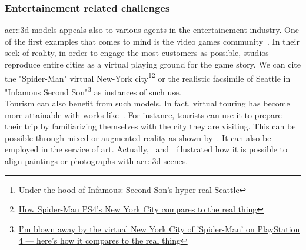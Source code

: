         \subsubsection{Entertainement related challenges}
            \gls{acr::3d} models appeals also to various agents in the entertainement industry.
            One of the first examples that comes to mind is the video games community~\parencite{watson2008procedural}.
            In their seek of reality, in order to engage the most customers as possible, studios reproduce entire cities as a virtual playing ground for the game story.
            We can cite the "Spider-Man" virtual New-York city\footnote{
                \href{https://www.polygon.com/2013/9/25/4702318/under-the-hood-of-infamous-second-son-hyper-real-seattle}{Under the hood of Infamous: Second Son's hyper-real Seattle}
            }\footnote{
                \href{https://www.polygon.com/e3/2018/6/12/17453588/spider-man-ps4-new-york-city-avengers-demo-preview}{How Spider-Man PS4’s New York City compares to the real thing}
            } or the realistic facsimile of Seattle in "Infamous Second Son"\footnote{
                \href{http://www.businessinsider.fr/us/spider-man-ps4-new-york-city-2018-9}{I'm blown away by the virtual New York City of 'Spider-Man' on PlayStation 4 — here's how it compares to the real thing}
            } as instances of such use.\\
            Tourism can also benefit from such models.
            In fact, virtual touring has become more attainable with works like~\textcite{koutsoudis20073d}.
            For instance, tourists can use it to prepare their trip by familiarizing themselves with the city they are visiting.
            This can be possible through mixed or augmented reality as shown by~\textcite{devaux20183d}.
            It can also be employed in the service of art.
            Actually,~\textcite{aubry2014painting} and~\textcite{russell2011automatic} illustrated how it is possible to align paintings or photographs with \gls{acr::3d} scenes.\\

